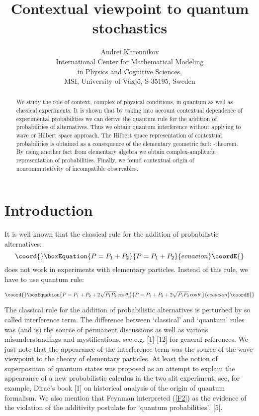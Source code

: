 \documentclass[12pt,oneside,final,a4paper]{article}
\title{Contextual viewpoint to quantum stochastics}
\author{Andrei Khrennikov\\
International Center for Mathematical Modeling\\
 in Physics and Cognitive Sciences,\\
 MSI, University of V\"axj\"o, S-35195, Sweden}
\begin{document}
\maketitle


\begin{abstract}
We study the role of context, complex of physical conditions,
in  quantum as well as classical experiments. It is shown that 
by taking into account contextual dependence of experimental
probabilities we can derive the quantum rule for the addition
of probabilities of alternatives. Thus we obtain quantum interference
without applying to wave or Hilbert space approach. The Hilbert
space representation of contextual probabilities is obtained
as  a consequence of the elementary geometric fact:
\myHighlight{$\cos$}\coordHE{}-theorem. By using another fact from elementary algebra
we obtain complex-amplitude representation of probabilities.
Finally, we found contextual origin of noncommutativity
of incompatible observables.



\end{abstract}





 
 
 
\section{Introduction}



It is well known that the classical rule for the addition of probabilistic alternatives:
\begin{equation}\coord{}\boxEquation{
\label{F1}
P=P_1+P_2
}{
P=P_1+P_2
}{ecuacion}\coordE{}\end{equation}
does not work in experiments with elementary particles. Instead of this rule, we have to use quantum rule:

\begin{equation}\coord{}\boxEquation{
\label{F2}
P=P_1+P_2+2\sqrt{P_1P_2}\cos\theta.
}{
P=P_1+P_2+2\sqrt{P_1P_2}\cos\theta.
}{ecuacion}\coordE{}\end{equation}

The classical rule for the addition of probabilistic alternatives is perturbed by so called 
interference term. The difference between `classical' and `quantum' rules was (and is) the source of
permanent discussions as well as various misunderstandings and mystifications, see e.g. [1]-[12]
for general
references. We just note that the appearance
of the interference term was the source of the wave-viewpoint to the theory of elementary particles.
At least the notion of superposition of quantum states was proposed as an attempt to explain the appearance
of a new probabilistic calculus in the two slit experiment, see, for example, Dirac's book [1] on historical 
analysis of the origin of quantum formalism. We also mention that Feynman interpreted (\ref{F2}) as the evidence
of the violation of the additivity postulate for `quantum probabilities', [5].
\end{document}
